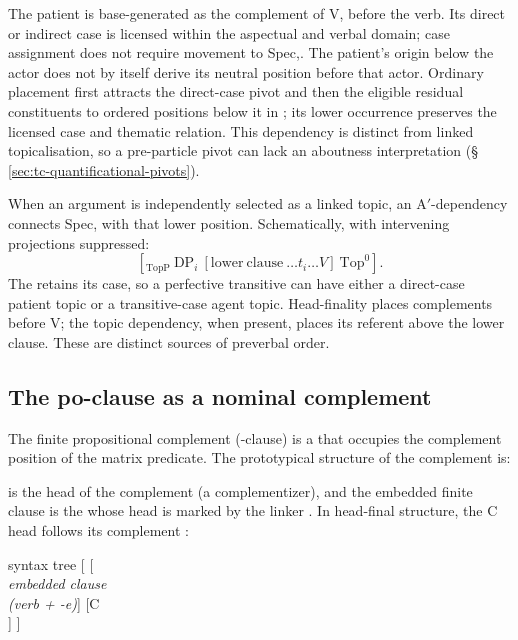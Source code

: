 The patient  is base-generated as the complement of V, before
 the verb. Its direct or indirect case is licensed within the aspectual and
 verbal domain; case assignment does not require movement to
 Spec,. The patient's origin below the actor does not by itself
 derive its neutral position before that actor. Ordinary placement first
 attracts the direct-case pivot and then the eligible residual constituents
 to ordered positions below it in ; its lower occurrence
 preserves the licensed case and thematic relation. This dependency is
 distinct from linked topicalisation, so a pre-particle pivot can lack an
 aboutness interpretation (§\,\ref{sec:tc-quantificational-pivots}).

When an argument is independently selected as a linked topic, an
 A$'$-dependency connects Spec, with that lower position.
 Schematically, with intervening projections suppressed:
\[
 [_{\mathrm{TopP}}\ \mathrm{DP}_{i}\
   [\mathrm{lower\ clause}\ \ldots t_i\ldots V]\ \mathrm{Top}^{0}].
\]
The  retains its case, so a perfective transitive can have either
 a direct-case patient topic or a transitive-case agent topic. Head-finality
 places complements before V; the topic dependency, when present, places its
 referent above the lower clause. These are distinct sources of preverbal
 order.

\subsection{The po-clause as a nominal  complement}
\label{sec:vm-po-comp}

The finite propositional complement (-clause) is a  that
occupies the complement position of the matrix predicate. The prototypical
structure of the complement \synhead{CP} is:

\begin{center}
\end{center}

\noindent {} is the head of the complement  (a
complementizer), and the embedded finite clause is the  whose
head is marked by the linker \ird{-e}. In head-final structure,
the C head follows its complement \synhead{TP}:

\begin{center}
\begin{forest}
  syntax tree
  [
    [{\\\textit{embedded clause}\\\textit{(verb + -e)}}]
    [{C\\\ird{po}}]
  ]
\end{forest}
\end{center}

